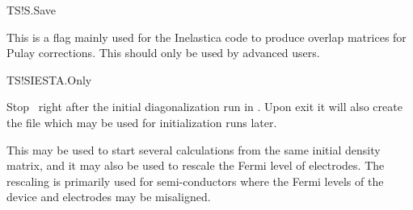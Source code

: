\begin{fdflogicalF}{TS!S.Save}

  This is a flag mainly used for the Inelastica code to produce
  overlap matrices for Pulay corrections. This should only be used by
  advanced users.

\end{fdflogicalF}


\begin{fdflogicalF}{TS!SIESTA.Only}

  Stop \tsiesta\ right after the initial diagonalization run in
  \siesta. Upon exit it will also create the  file which
  may be used for initialization runs later.

  This may be used to start several calculations from the same initial
  density matrix, and it may also be used to rescale the Fermi level
  of electrodes. The rescaling is primarily used for semi-conductors
  where the Fermi levels of the device and electrodes may be
  misaligned. 

\end{fdflogicalF}


